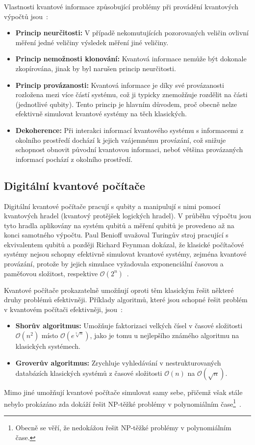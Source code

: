Vlastnosti kvantové informace způsobující problémy při provádění kvantových výpočtů jsou~\cite{NaturalComputing}:
\begin{itemize}
    \item \textbf{Princip neurčitosti:} V případě nekomutujících pozorovaných veličin ovlivní měření jedné veličiny výsledek měření jiné veličiny. 
    \item \textbf{Princip nemožnosti klonování:} Kvantová informace nemůže být dokonale zkopírována, jinak by byl narušen princip neurčitosti. 
    \item \textbf{Princip provázanosti:} Kvantová informace je díky své provázanosti rozložena mezi více částí systému, což ji typicky znemožňuje rozdělit na části (jednotlivé qubity). Tento princip je hlavním důvodem, proč obecně nelze efektivně simulovat kvantové systémy na těch klasických. 
    \item \textbf{Dekoherence:} Při interakci informací kvantového systému s informacemi z okolního prostředí dochází k jejich vzájemnému provázání, což snižuje schopnost obnovit původní kvantovou informaci, neboť většina provázaných informací pochází z okolního prostředí. 
\end{itemize}

\subsection{Digitální kvantové počítače}
Digitální kvantové počítače pracují s qubity a manipulují s nimi pomocí kvantových hradel (kvantový protějšek logických hradel).
V průběhu výpočtu jsou tyto hradla aplikovány na systém qubitů a měření qubitů je provedeno až na konci samotného výpočtu. 
Paul Benioff uvažoval Turingův stroj pracující s ekvivalentem qubitů a později Richard Feynman dokázal, že klasické počítačové systémy nejsou schopny efektivně simulovat kvantové systémy, zejména kvantové provázání, protože by jejich simulace vyžadovala exponenciální časovou a paměťovou složitost, respektive $\mathcal{O}\left( 2^n \right)$~\cite{NaturalComputing,QuantumComuting-Introduction}. 

Kvantové počítače prokazatelně umožňují oproti těm klasickým řešit některé druhy problémů efektivněji. 
Příklady algoritmů, které jsou schopné řešit problém v kvantovém počítači efektivněji, jsou~\cite{NaturalComputing}: 
\begin{itemize}
    \item \textbf{Shorův algoritmus:} Umožňuje faktorizaci velkých čísel v časové složitosti $\mathcal{O}\left( n^2 \right)$ místo $\mathcal{O}\left(e^{\sqrt[3]{n}} \right)$, jako je tomu u nejlepšího známého algoritmu na klasických systémech.
    \item \textbf{Groverův algoritmus:} Zrychluje vyhledávání v nestrukturovaných databázích klasických systémů z časové složitosti $\mathcal{O}\left( n \right)$ na $\mathcal{O}\left( \sqrt{n} \right)$. 
\end{itemize}
Mimo jiné umožňují kvantové počítače simulovat samy sebe, přičemž však stále nebylo prokázáno zda dokáží řešit NP-těžké problémy v polynomiálním čase\footnote{Obecně se věří, že nedokážou řešit NP-těžké problémy v polynomiálním čase.}~\cite{NaturalComputing}. 

